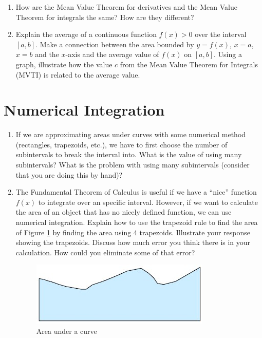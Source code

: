 \begin{enumerate}
\item   How are the Mean Value Theorem for derivatives and the Mean Value Theorem for integrals the same?  How are they different?

\item   Explain the average of a continuous function $f(x) > 0$ over the interval $[a, b]$.  Make a connection between the area bounded by $y = f(x)$, $x = a$, $x = b$ and the $x$-axis and the average value of $f(x)$ on $[a, b]$.  Using a graph, illustrate how the value $c$ from the Mean Value Theorem for Integrals (MVTI) is related to the average value.
\end{enumerate}\section{Numerical Integration}\begin{enumerate}

\item   If we are approximating areas under curves with some numerical method (rectangles, trapezoids, etc.), we have to first choose the number of subintervals to break the interval into.  What is the value of using many subintervals?  What is the problem with using many subintervals (consider that you are doing this by hand)?

\item   The Fundamental Theorem of Calculus is useful if we have a ``nice''  function $f(x)$ to integrate over an specific interval.  However, if we want to calculate the area of an object that has no nicely defined function, we can use numerical integration.  Explain how to use the trapezoid rule to find the area of Figure \ref{Chapter5Fig} by finding the area using 4 trapezoids.  Illustrate your response showing the trapezoids.  Discuss how much error you think there is in your calculation.  How could you eliminate some of that error?

\begin{figure}[ht]
\centering		
\includegraphics{TeXGraphics/Chapter5Fig.jpg}	
\caption{Area under a curve}	
\label{Chapter5Fig}\end{figure}




\end{enumerate}
